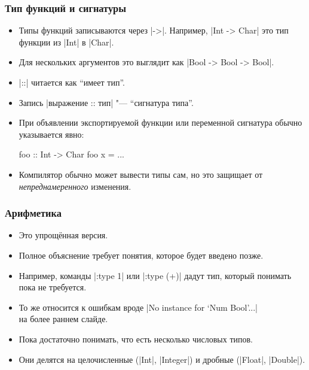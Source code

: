 \documentclass[10pt]{beamer}
\begin{document}
\begin{frame}[fragile]
  \frametitle{Тип функций и сигнатуры}
  \begin{itemize}
    \item Типы функций записываются через \haskinline|->|. Например, \haskinline|Int -> Char| это тип функции из \haskinline|Int| в \haskinline|Char|.

    \item Для нескольких аргументов это выглядит как \pause\haskinline|Bool -> Bool -> Bool|.

    \item \haskinline|::| читается как \enquote{имеет тип}.

    \item Запись \haskinline|выражение :: тип| "--- \enquote{сигнатура типа}.

    \item При объявлении экспортируемой функции или переменной  сигнатура обычно указывается явно:
          \begin{haskell}
            foo :: Int -> Char
            foo x = ...
          \end{haskell}
    \item Компилятор обычно может вывести типы сам, но это защищает от \emph{непреднамеренного} изменения.
  \end{itemize}
\end{frame}

\begin{frame}[fragile]
  \frametitle{Арифметика}
  \begin{itemize}
    \item Это упрощённая версия.
    \item Полное объяснение требует понятия, которое будет введено позже.
    \item Например, команды \haskinline|:type 1| или \haskinline|:type (+)| дадут тип, который понимать пока не требуется.
    \item То же относится к ошибкам вроде \ghcinline[breaklines=false]|No instance for ‘Num Bool’...|\\ на более раннем слайде.
    \item Пока достаточно понимать, что есть несколько числовых типов.
    \item Они делятся на целочисленные (\haskinline|Int|, \haskinline|Integer|) и дробные (\haskinline|Float|, \haskinline|Double|).
  \end{itemize}
\end{frame}
\end{document}
